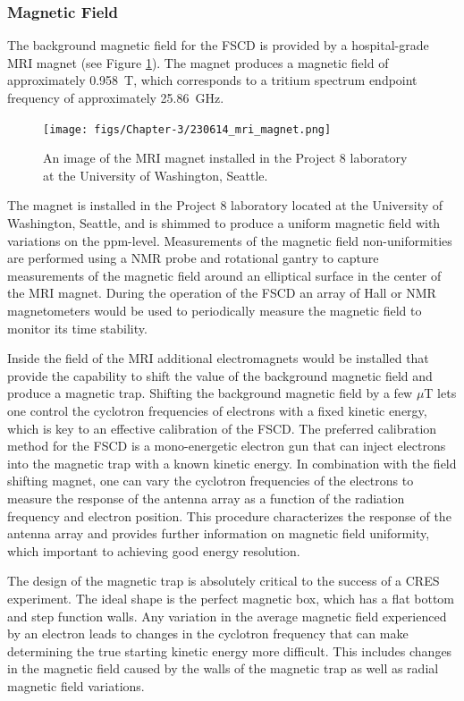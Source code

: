 \subsubsection*{Magnetic Field}

The background magnetic field for the FSCD is provided by a hospital-grade MRI magnet (see Figure \ref{fig:chap3-mri-magnet}). The magnet produces a magnetic field of approximately 0.958~T, which corresponds to a tritium spectrum endpoint frequency of approximately 25.86~GHz. 
\begin{figure}[htbp]
    \centering
    \texttt{[image: figs/Chapter-3/230614\_mri\_magnet.png]}
    \caption{\label{fig:chap3-mri-magnet} An image of the MRI magnet installed in the Project 8 laboratory at the University of Washington, Seattle.}
\end{figure}
The magnet is installed in the Project 8 laboratory located at the University of Washington, Seattle, and is shimmed to produce a uniform magnetic field with variations on the ppm-level. Measurements of the magnetic field non-uniformities are performed using a NMR probe and rotational gantry to capture measurements of the magnetic field around an elliptical surface in the center of the MRI magnet. During the operation of the FSCD an array of Hall or NMR magnetometers would be used to periodically measure the magnetic field to monitor its time stability.

Inside the field of the MRI additional electromagnets would be installed that provide the capability to shift the value of the background magnetic field and produce a magnetic trap. Shifting the background magnetic field by a few $\mu$T lets one control the cyclotron frequencies of electrons with a fixed kinetic energy, which is key to an effective calibration of the FSCD. The preferred calibration method for the FSCD is a mono-energetic electron gun that can inject electrons into the magnetic trap with a known kinetic energy. In combination with the field shifting magnet, one can vary the cyclotron frequencies of the electrons to measure the response of the antenna array as a function of the radiation frequency and electron position. This procedure characterizes the response of the antenna array and provides further information on magnetic field uniformity, which important to achieving good energy resolution.

The design of the magnetic trap is absolutely critical to the success of a CRES experiment. The ideal shape is the perfect magnetic box, which has a flat bottom and step function walls. Any variation in the average magnetic field experienced by an electron leads to changes in the cyclotron frequency that can make determining the true starting kinetic energy more difficult. This includes changes in the magnetic field caused by the walls of the magnetic trap as well as radial magnetic field variations. 

